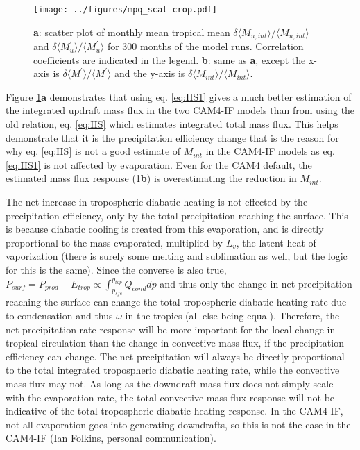 \documentclass[letterpaper,12pt,titlepage,oneside,final]{book}
\begin{document}
\begin{figure}[H]
\centering
\noindent\texttt{[image: ../figures/mpq\_scat-crop.pdf]}\hfill
\caption{\footnotesize \footnotesize \textbf{a}: scatter plot of monthly mean tropical mean $\delta{\langle{M_{u,int}}}\rangle/\langle{M_{u,int}}\rangle$ and $\delta{\langle{M_{u}^{'}}}\rangle/\langle{M_{u}^{'}}\rangle$ for 300 months of the model runs. Correlation coefficients are indicated in the legend. \textbf{b}: same as \textbf{a}, except the x-axis is $\delta{\langle{M^{'}}}\rangle/\langle{M^{'}}\rangle$ and the y-axis is $\delta{\langle{M_{int}}}\rangle/\langle{M_{int}}\rangle$. }
\label{fig:newmpq}
\end{figure}

Figure \ref{fig:newmpq}\textbf{a} demonstrates that using eq. \ref{eq:HS1} gives a much better estimation of the integrated updraft mass flux in the two CAM4-IF models than from using the old relation, eq. \ref{eq:HS} which estimates integrated total mass flux. This helps demonstrate that it is the precipitation efficiency change that is the reason for why eq. \ref{eq:HS} is not a good estimate of $M_{int}$ in the CAM4-IF models as eq. \ref{eq:HS1} is not affected by evaporation. Even for the CAM4 default, the estimated mass flux response (\ref{fig:newmpq}\textbf{b}) is overestimating the reduction in $M_{int}$. 

The net increase in tropospheric diabatic heating is not effected by the precipitation efficiency, only by the total precipitation reaching the surface. This is because diabatic cooling is created from this evaporation, and is directly proportional to the mass evaporated, multiplied by $L_{v}$, the latent heat of vaporization (there is surely some melting and sublimation as well, but the logic for this is the same). Since the converse is also true, $P_{surf}=P_{prod}-E_{trop} \propto \int_{p_{sfc}}^{p_{top}}Q_{cond}dp$ and thus only the change in net precipitation reaching the surface can change the total tropospheric diabatic heating rate due to condensation and thus $\omega$ in the tropics (all else being equal). Therefore, the net precipitation rate response will be more important for the local change in tropical circulation than the change in convective mass flux, if the precipitation efficiency can change. The net precipitation will always be directly proportional to the total integrated tropospheric diabatic heating rate, while the convective mass flux may not. As long as the downdraft mass flux does not simply scale with the evaporation rate, the total convective mass flux response will not be indicative of the total tropospheric diabatic heating response. In the CAM4-IF, not all evaporation goes into generating downdrafts, so this is not the case in the CAM4-IF (Ian Folkins, personal communication).
\end{document}
